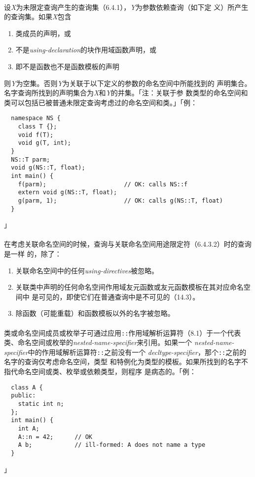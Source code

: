 \paragraph{}
设\textit{X}为未限定查询产生的查询集（6.4.1），\textit{Y}为参数依赖查询（如下定
义）所产生的查询集。如果\textit{X}包含
\begin{enumerate}
  \item{类成员的声明，或}
  \item{不是\textit{using-declaration}的块作用域函数声明，或}
  \item{即不是函数也不是函数模板的声明}
\end{enumerate}
则\textit{Y}为空集。否则\textit{Y}为关联于以下定义的参数的命名空间中所能找到的
声明集合。名字查询所找到的声明集合为\textit{X}和\textit{Y}的并集。「注：关联于参
数类型的命名空间和类可以包括已被普通未限定查询考虑过的命名空间和类。」「例：
\begin{lstlisting}
  namespace NS {
    class T {};
    void f(T);
    void g(T, int);
  }
  NS::T parm;
  void g(NS::T, float);
  int main() {
    f(parm);                      // OK: calls NS::f
    extern void g(NS::T, float);
    g(parm, 1);                   // OK: calls g(NS::T, float)
  }
\end{lstlisting}」

\paragraph{}
在考虑关联命名空间的时候，查询与关联命名空间用途限定符（6.4.3.2）时的查询是一样
的，除了：
\begin{enumerate}
  \item{关联命名空间中的任何\textit{using-directives}被忽略。}
  \item{关联类中声明的任何命名空间作用域友元函数或友元函数模板在其对应命名空间中
    是可见的，即使它们在普通查询中是不可见的（14.3）。}
  \item{除函数（可能重载）和函数模板以外的名字被忽略。}
\end{enumerate}

\paragraph{}
类或命名空间成员或枚举子可通过应用\texttt{::}作用域解析运算符（8.1）于一个代表
类、命名空间或枚举的\textit{nested-name-specifier}来引用。如果一个
\textit{nested-name-specifier}中的作用域解析运算符\texttt{::}之前没有一个
\textit{decltype-specifier}，那个\texttt{::}之前的名字的查询仅考虑命名空间，类型
和特例化为类型的模板。如果所找到的名字不指代命名空间或类、枚举或依赖类型，则程序
是病态的。「例：
\begin{lstlisting}
  class A {
  public:
    static int n;
  };
  int main() {
    int A;
    A::n = 42;      // OK
    A b;            // ill-formed: A does not name a type
  }
\end{lstlisting}」

